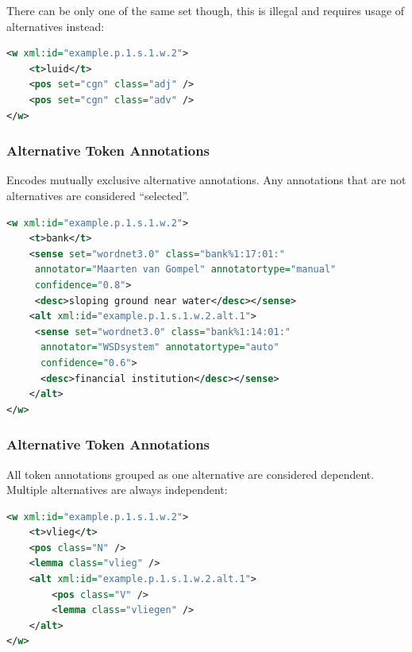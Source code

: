 \documentclass[compress]{beamer}
\begin{document}
\begin{frame}
\begin{frame}[fragile]
There can be only one of the same set though, this is illegal and requires usage of alternatives instead:

\begin{lstlisting}[language=xml]
<w xml:id="example.p.1.s.1.w.2">
    <t>luid</t>
    <pos set="cgn" class="adj" />
    <pos set="cgn" class="adv" />
</w>                         
\end{lstlisting}   

\end{frame}


\begin{frame}[fragile]
\frametitle{Alternative Token Annotations}

Encodes mutually exclusive alternative annotations. Any annotations that are not alternatives are considered ``selected''.

\begin{lstlisting}[language=xml]
<w xml:id="example.p.1.s.1.w.2">
    <t>bank</t>
    <sense set="wordnet3.0" class="bank%1:17:01:"    
     annotator="Maarten van Gompel" annotatortype="manual" 
     confidence="0.8">
     <desc>sloping ground near water</desc></sense>
    <alt xml:id="example.p.1.s.1.w.2.alt.1">
     <sense set="wordnet3.0" class="bank%1:14:01:"
      annotator="WSDsystem" annotatortype="auto" 
      confidence="0.6">     
      <desc>financial institution</desc></sense> 
    </alt>
</w>                         
\end{lstlisting}        

\end{frame}

\begin{frame}[fragile]
\frametitle{Alternative Token Annotations}

All token annotations grouped as one alternative are considered dependent. Multiple alternatives are always independent:

\begin{lstlisting}[language=xml]
<w xml:id="example.p.1.s.1.w.2">
    <t>vlieg</t>
    <pos class="N" />
    <lemma class="vlieg" />
    <alt xml:id="example.p.1.s.1.w.2.alt.1">
        <pos class="V" />
        <lemma class="vliegen" />
    </alt>
</w>                         
\end{lstlisting}        

\end{frame}

\end{frame}
\end{document}
